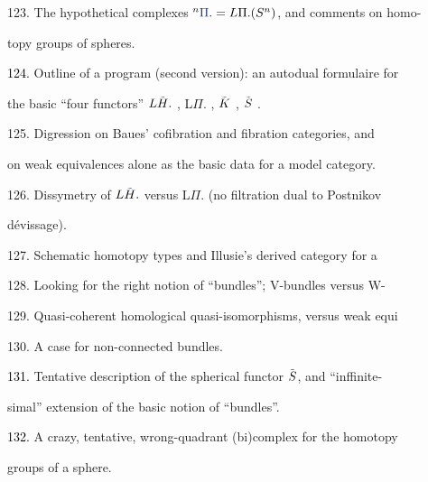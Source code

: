 \documentclass[10pt,oneside]{book}
\newcommand{\hand}[1]{{\ifnum\EditionMode=2\color{black}\else\color{PSHand}\fi #1}}
\begin{document}
123. The hypothetical complexes $^{n}\hand{\Pi}. = L\Pi.(S^{n})$, and comments on homo-\par%
topy groups of spheres.\par

\hand{\textcircled{\textcolor{black}{124.}}} Outline of a program (second version): an autodual formulaire for\par
the basic ``four functors'' $L\hand{\tilde{\textcolor{black}{H}}}.$ , L$\Pi$. , $\hand{\tilde{\textcolor{black}{K}}}$ , $\hand{\tilde{\textcolor{black}{S}}}$ .\par

125. Digression on Baues' cofibration and fibration categories, and\par
on weak equivalences alone as the basic data for a model category.\par

126. Dissymetry of $L\hand{\tilde{\textcolor{black}{H}}}.$ versus L$\Pi$. (no filtration dual to Postnikov\par
dévissage).\par

127. Schematic homotopy types and Illusie's derived category for a \par

128. Looking for the right notion of ``bundles\hand{''}; V-bundles versus W-\par

129. Quasi-coherent homological quasi-isomorphisms, versus weak equi\par

130. A case for non-connected bundles.\par

\hand{\textcircled{\textcolor{black}{131.}}} Tentative description of the spherical functor $\hand{\tilde{\textcolor{black}{S}}}$, and ``inffinite-\par%
simal'' extension of the basic notion of ``bundles''.\par

\hand{\textcircled{\textcolor{black}{132.}}} A crazy\hand{,} tentative\hand{,} wrong-quadrant (bi)complex for the homotopy\par
groups of a sphere.\par
\margin{\hrulefill}\par
\end{document}
